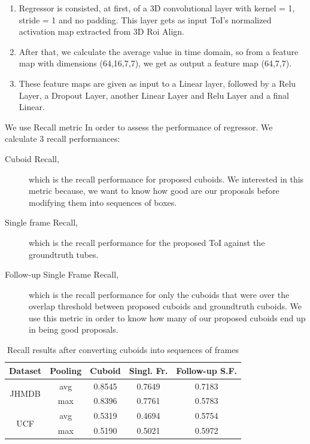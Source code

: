 \begin{enumerate}
\item Regressor is consisted, at first, of a 3D convolutional layer with kernel = 1, stride = 1 and no padding. This layer gets as input ToI's normalized activation map extracted from 3D Roi Align.
\item After that, we calculate the average value in time domain, so from a feature map with dimensions (64,16,7,7), we get as output a feature map (64,7,7).
\item These feature maps are given as input to a Linear layer, followed by a Relu Layer, a Dropout Layer, another Linear Layer and Relu Layer and a final Linear.
\end{enumerate}

We use Recall metric In order to assess the performance of regressor. We calculate 3 recall performances:
\begin{description}
\item [Cuboid Recall,] which is the recall performance for proposed cuboids. We interested in this metric because, we
  want to know how good are our proposals before modifying them into sequences of boxes.

\item [Single frame Recall,] which is the recall performance for the proposed ToI against the groundtruth tubes.
\item[Follow-up Single Frame Recall,] which is the recall performance for only the cuboids that were over the overlap threshold between
  proposed cuboids and groundtruth cuboids. We use this metric in order to know how many of our proposed cuboids end up in being good proposals.
\end{description}

\begin{table}[h]
  \centering
  \begin{tabular} {||c | c || c | c | c ||}
    \hline
    \textbf{Dataset} & \textbf{Pooling} & \textbf{Cuboid} & \textbf{Singl. Fr. } &  \textbf{Follow-up S.F.}\\
    \hline                
    \multirow{2}{*}{JHMDB} & avg & 0.8545 & 0.7649 & 0.7183 \\
    \cline{2-5}
    {} & max & 0.8396 & 0.7761 & 0.5783 \\
    \cline{1-5}
    \multirow{2}{*}{UCF} & avg & 0.5319 & 0.4694 & 0.5754 \\
    \cline{2-5}
    {} & max & 0.5190 & 0.5021 & 0.5972 \\
    \cline{1-5}
                                   
  \end{tabular}
  \caption{Recall results after converting cuboids into sequences of frames}
  \label{table:reg_1_1}
\end{table}

